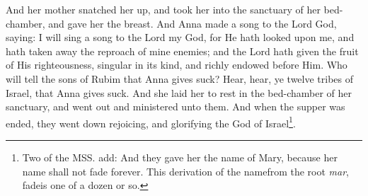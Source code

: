 \documentclass[12pt]{book} %
\begin{document}
\begin{pairs}
\begin{Rightside}
\pend\pstart
And her mother snatched her up, and took her into the sanctuary of her bed-chamber, and gave her the breast. And Anna made a song to the Lord God, saying: I will sing a song to the Lord my God, for He hath looked upon me, and hath taken away the reproach of mine enemies; and the Lord hath given the fruit of His righteousness, singular in its kind, and richly endowed before Him. Who will tell the sons of Rubim that Anna gives suck? Hear, hear, ye twelve tribes of Israel, that Anna gives suck. And she laid her to rest in the bed-chamber of her sanctuary, and went out and ministered unto them. And when the supper was ended, they went down rejoicing, and glorifying the God of Israel\footnote{Two of the MSS. add: And they gave her the name of Mary, because her name shall not fade forever. This derivation of the name\textemdash from the root \textit{mar}, fade\textemdash is one of a dozen or so.}.

\pend\pstart
{}

\pend\endnumbering\end{Rightside}
\end{pairs}
\Columns
\end{document}
